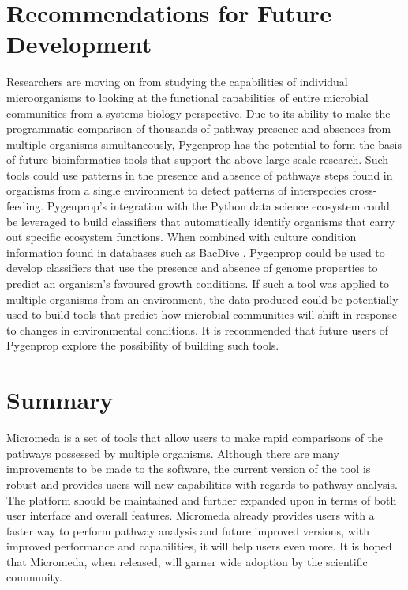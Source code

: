 \section{Recommendations for Future Development}

Researchers are moving on from studying the capabilities of individual microorganisms to looking at the functional capabilities of entire microbial communities from a systems biology perspective. Due to its ability to make the programmatic comparison of thousands of pathway presence and absences from multiple organisms simultaneously, Pygenprop has the potential to form the basis of future bioinformatics tools that support the above large scale research. Such tools could use patterns in the presence and absence of pathways steps found in organisms from a single environment to detect patterns of interspecies cross-feeding. Pygenprop's integration with the Python data science ecosystem could be leveraged to build classifiers that automatically identify organisms that carry out specific ecosystem functions. When combined with culture condition information found in databases such as BacDive \cite{reimer2018bac}, Pygenprop could be used to develop classifiers that use the presence and absence of genome properties to predict an organism's favoured growth conditions. If such a tool was applied to multiple organisms from an environment, the data produced could be potentially used to build tools that predict how microbial communities will shift in response to changes in environmental conditions. It is recommended that future users of Pygenprop explore the possibility of building such tools.

\section{Summary}

Micromeda is a set of tools that allow users to make rapid comparisons of the pathways possessed by multiple organisms. Although there are many improvements to be made to the software, the current version of the tool is robust and provides users will new capabilities with regards to pathway analysis. The platform should be maintained and further expanded upon in terms of both user interface and overall features. Micromeda already provides users with a faster way to perform pathway analysis and future improved versions, with improved performance and capabilities, it will help users even more. It is hoped that Micromeda, when released, will garner wide adoption by the scientific community.